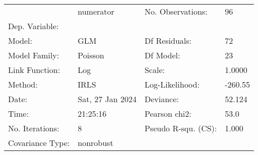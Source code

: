 \begin{tabular}{llll}
\toprule
 & numerator &   No. Observations:   &     96 \\
Dep. Variable: &  &  &  \\
\midrule
Model: & GLM &   Df Residuals:       &     72 \\
Model Family: & Poisson &   Df Model:           &     23 \\
Link Function: & Log &   Scale:              &   1.0000 \\
Method: & IRLS &   Log-Likelihood:     &  -260.55 \\
Date: & Sat, 27 Jan 2024 &   Deviance:           &   52.124 \\
Time: & 21:25:16 &   Pearson chi2:       &   53.0 \\
No. Iterations: & 8 &   Pseudo R-squ. (CS): &  1.000 \\
Covariance Type: & nonrobust &                       &   \\
\bottomrule
\end{tabular}
